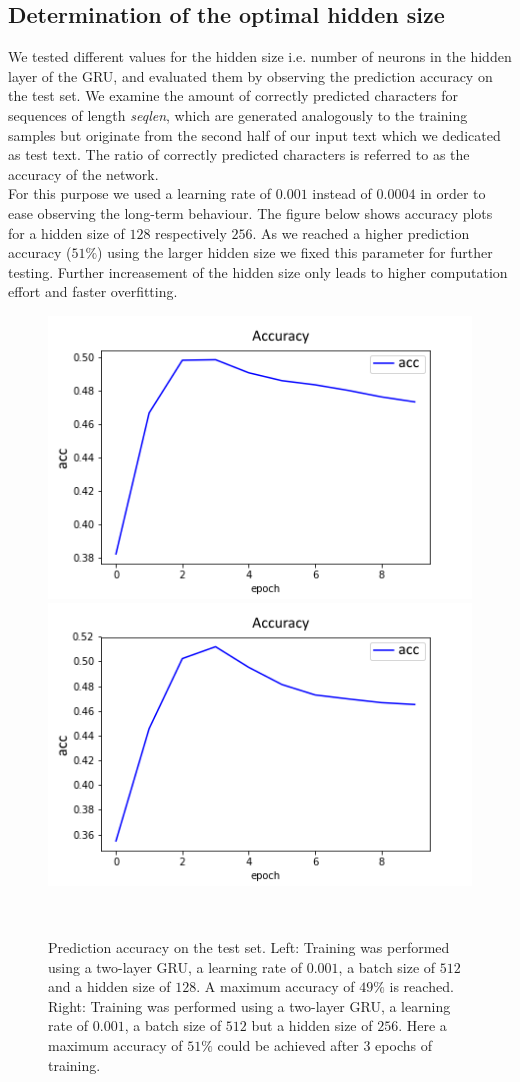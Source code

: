 \documentclass[11pt,a4paper,bibliography=totocnumbered,listof=totocnumbered]{scrartcl}
\begin{document}
\subsection{Determination of the optimal hidden size}
We tested different values for the hidden size i.e. number of neurons in the hidden layer of the GRU, and evaluated them by observing the prediction accuracy on the test set. 
We examine the amount of correctly predicted characters for sequences of length \textit{seqlen}, which are generated analogously to the training samples but originate from the second half of our input text which we dedicated as test text. The ratio of correctly predicted characters is referred to as the accuracy of the network. \\
For this purpose we used a learning rate of $0.001$ instead of $0.0004$ in order to ease observing the long-term behaviour. The figure below shows accuracy plots for a hidden size of $128$ respectively $256$. As we reached a higher prediction accuracy ($51 \%$) using the larger hidden size we fixed this parameter for further testing.  Further increasement of the hidden size only leads to higher computation effort and faster overfitting.

\begin{figure}[!ht]
   \begin{minipage}{\textwidth}
     \centering
     \includegraphics[width=.4\textwidth]{acc_hs128}
     \includegraphics[width=.4\textwidth]{acc_hs256}
     \caption{Prediction accuracy on the test set. Left: Training was performed using a two-layer GRU, a learning rate of $0.001$, a batch size of $512$ and a hidden size of $128$. A maximum accuracy of $49\%$ is reached. Right: Training was performed using a two-layer GRU, a learning rate of $0.001$, a batch size of $512$ but a hidden size of $256$. Here a maximum accuracy of $51 \%$ could be achieved after 3 epochs of training.}
     \label{fig:sub1}
   \end{minipage}\\[1em]   
\end{figure}
\end{document}
